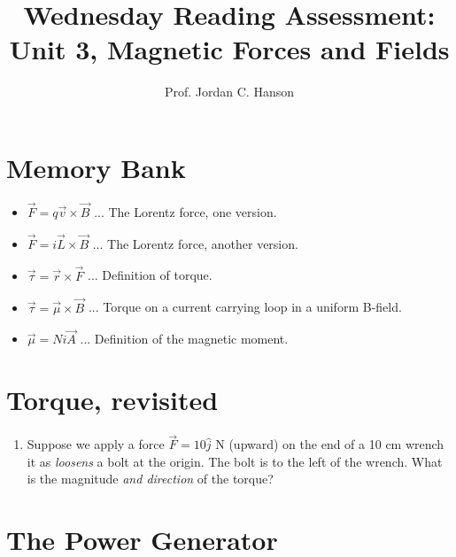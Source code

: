 \documentclass{article}
\begin{document}
\title{Wednesday Reading Assessment: Unit 3, Magnetic Forces and Fields}
\author{Prof. Jordan C. Hanson}

\maketitle

\section{Memory Bank}

\begin{itemize}
\item $\vec{F} = q\vec{v} \times \vec{B}$ ... The Lorentz force, one version.
\item $\vec{F} = i\vec{L} \times \vec{B}$ ... The Lorentz force, another version.
\item $\vec{\tau} = \vec{r} \times \vec{F}$ ... Definition of torque.
\item $\vec{\tau} = \vec{\mu} \times \vec{B}$ ... Torque on a current carrying loop in a uniform B-field.
\item $\vec{\mu} = Ni\vec{A}$ ... Definition of the magnetic moment.
\end{itemize}

\section{Torque, revisited}

\begin{enumerate}
\item Suppose we apply a force $\vec{F} = 10\hat{j}$ N (upward) on the end of a 10 cm wrench it as \textit{loosens} a bolt at the origin.  The bolt is to the left of the wrench.  What is the magnitude \textit{and direction} of the torque? \\ \vspace{1cm}
\end{enumerate}

\section{The Power Generator}
\end{document}
